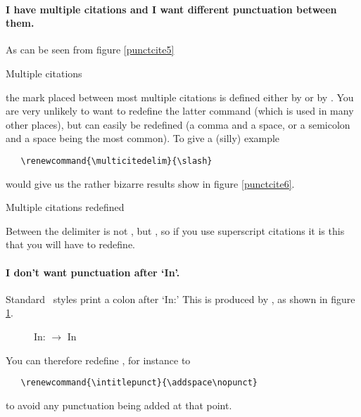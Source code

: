 \paragraph{I have multiple citations and I want different punctuation between them.} As can be seen from figure \ref{punctcite5}
\begin{marginfigure}[4ex]
\vspace{3pt}%
\caption{Multiple citations}\label{punctcite5}
\end{marginfigure}
the mark placed between most multiple citations is defined either by  or by . You are very unlikely to want to redefine the latter command (which is used in many other places), but  can easily be redefined (a comma and a space, or a semicolon and a space being the most common). To give a (silly) example
\begin{Verbatim}
   \renewcommand{\multicitedelim}{\slash}
\end{Verbatim}
would give us the rather bizarre results show in figure \ref{punctcite6}.
\begin{marginfigure}[-8ex]
\vspace{3pt}%
\caption{Multiple citations redefined}\label{punctcite6}
\end{marginfigure}

Between  the delimiter is not , but , so if you use superscript citations it is this that you will have to redefine.

\paragraph{I don't want punctuation after `In'.} Standard \biblatex\ styles print a colon after `In:' This is produced by , as shown in figure \ref{punctcite7}.
\begin{figure}
\caption{In: $\rightarrow$ In}\label{punctcite7}
\end{figure}

You can therefore redefine , for instance to
\begin{Verbatim}
   \renewcommand{\intitlepunct}{\addspace\nopunct}
\end{Verbatim}
to avoid any punctuation being added at that point.

